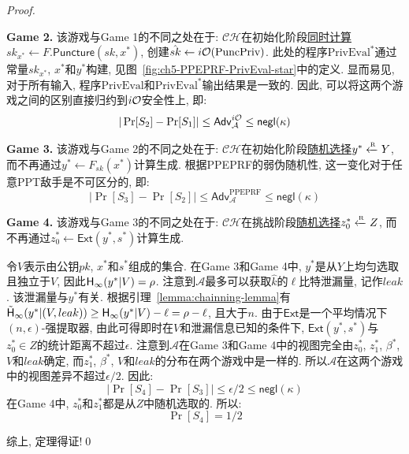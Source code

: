 \begin{proof}
\begin{trivlist}
\item \textbf{Game 2.} 该游戏与Game 1的不同之处在于: $\mathcal{CH}$在初始化阶段\underline{同时计算$sk_{x^*} \leftarrow F.\mathsf{Puncture}(sk, x^*)$}, 创建$\hat{sk} \leftarrow i\mathcal{O}(\text{PuncPriv})$. 此处的程序$\text{PrivEval}^*$通过常量$sk_{x^*}$, $x^*$和$y^*$构建, 见图~\ref{fig:ch5-PPEPRF-PrivEval-star}中的定义. 显而易见, 对于所有输入, 程序$\text{PrivEval}$和$\text{PrivEval}^*$输出结果是一致的. 因此, 可以将这两个游戏之间的区别直接归约到$i\mathcal{O}$安全性上, 即:
\begin{equation*}
    |\Pr[S_2] - \Pr[S_1]| \leq \mathsf{Adv}_\mathcal{A}^{i\mathcal{O}} \leq \mathsf{negl}(\kappa)
\end{equation*} 

\item \textbf{Game 3.} 该游戏与Game 2的不同之处在于: $\mathcal{CH}$在初始化阶段\underline{随机选择$y^* \xleftarrow{\textup{\tiny R}} Y$}, 而不再通过$y^* \leftarrow F_{sk}(x^*)$计算生成. 根据PPEPRF的弱伪随机性, 这一变化对于任意PPT敌手是不可区分的, 即: 
\begin{equation*}
    |\Pr[S_3] - \Pr[S_2]| \leq \mathsf{Adv}_\mathcal{A}^{\text{PPEPRF}} \leq \mathsf{negl}(\kappa)
\end{equation*}

\item \textbf{Game 4.} 该游戏与Game 3的不同之处在于: $\mathcal{CH}$在挑战阶段\underline{随机选择$z_0^* \xleftarrow{\textup{\tiny R}} Z$}, 而不再通过$z_0^* \leftarrow \mathsf{Ext}(y^*, s^*)$计算生成. 

令$V$表示由公钥$pk$, $x^*$和$s^*$组成的集合. 在Game 3和Game 4中, $y^*$是从$Y$上均匀选取且独立于$V$, 因此$\mathsf{H}_\infty(y^*|V) = \rho$. 注意到$\mathcal{A}$最多可以获取$\hat{k}$的$\ell$比特泄漏量, 记作$leak$. 该泄漏量与$y^*$有关. 根据引理~\ref{lemma:chainning-lemma}有$\tilde{\mathsf{H}}_\infty(y^*|(V, leak)) \geq \mathsf{H}_\infty(y^*|V) - \ell = \rho - \ell$, 且大于$n$. 由于$\mathsf{Ext}$是一个平均情况下$(n, \epsilon)$-强提取器, 由此可得即时在$V$和泄漏信息已知的条件下, $\mathsf{Ext}(y^*, s^*)$与$z_0^* \in Z$的统计距离不超过$\epsilon$. 注意到$\mathcal{A}$在Game 3和Game 4中的视图完全由$z_0^*$, $z_1^*$, $\beta^*$, $V$和$leak$确定, 而$z_1^*$, $\beta^*$, $V$和$leak$的分布在两个游戏中是一样的. 所以$\mathcal{A}$在这两个游戏中的视图差异不超过$\epsilon/2$. 因此: 
\begin{equation*}
    |\Pr[S_4] - \Pr[S_3]| \leq \epsilon/2 \leq \mathsf{negl}(\kappa)
\end{equation*}
在Game 4中, $z_0^*$和$z_1^*$都是从$Z$中随机选取的. 所以: 
\begin{equation*}
    \Pr[S_4] = 1/2
\end{equation*}
\end{trivlist}

综上, 定理得证!\qed 
\end{proof}

